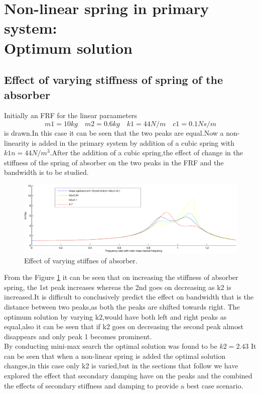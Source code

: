 \section{Non-linear spring in primary system:\\ Optimum solution}
\subsection{Effect of varying stiffness of spring of the absorber } 
Initially an FRF for the linear paraameters $$ m1=10 kg\quad m2=0.6kg\quad k1=44 N/m\quad c1=0.1 Ns/m $$ is drawn.In this case it can be seen that the two peaks are equal.Now a non-linearity is added in the primary system by addition of a cubic spring with $k1n=44 N/m^3$.After the addition of a cubic spring,the effect of change in the stiffness of the spring of absorber on the two peaks in the FRF and the bandwidth is to be studied.

\begin{figure}[h!]
\includegraphics[width=\textwidth,height=0.5\textwidth]{"figures/nonlinearity_primaryymass_3_effect of secondaryspring"}
  \caption{Effect of varying stiffnes of absorber.}
  \label{fig:varying stiffnes of absorber}
  \end{figure}
From the Figure \ref{fig:varying stiffnes of absorber} it can be seen that on increasing the stiffness of absorber spring, the 1st peak increases whereas the 2nd  goes on decreasing as k2 is increased.It is difficult to conclusively predict the effect on bandwidth that is the distance between two peaks,as both the peaks are shifted towards right.
The optimum solution by varying k2,would have both left and right peaks as equal,also it can be seen that if k2 goes on decreasing the second peak almost disappears and only peak 1 becomes prominent.\\
By conducting mini-max search the optimal solution was found to be $k2=2.43$ It can be seen that when a non-linear spring is added the optimal solution changes,in this case only k2 is varied,but in the sections that follow we have explored the effect that secondary damping have on the peaks and the combined the effects of secondary stiffness and damping to provide a best case scenario.\\
  

